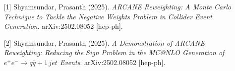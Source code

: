 \begin{talk}
\begin{enumerate}
    \item[{[1]}] Shyamsundar, Prasanth (2025). {\it ARCANE Reweighting: A Monte Carlo Technique to Tackle the Negative Weights Problem in Collider Event Generation}. arXiv:2502.08052 [hep-ph].
    \item[{[2]}] Shyamsundar, Prasanth (2025). {\it A Demonstration of ARCANE Reweighting: Reducing the Sign Problem in the MC@NLO Generation of $e^+ e^- \longrightarrow q\bar{q} + 1\,jet$ Events}. arXiv:2502.08052 [hep-ph].
\end{enumerate}

\end{talk}

